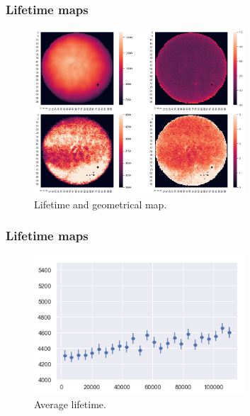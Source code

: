 \begin{frame}
\frametitle{Lifetime maps}
\begin{figure}
  \begin{center}
      \includegraphics[width=0.7\textwidth]{img/r6581/maps.png}
    \caption{Lifetime and geometrical map.}
  \end{center}
\end{figure}
\end{frame}

\begin{frame}
\frametitle{Lifetime maps}
\begin{figure}
  \begin{center}
      \includegraphics[width=0.7\textwidth]{img/r6581/AverageLT.png}
    \caption{Average lifetime.}
  \end{center}
\end{figure}
\end{frame}

